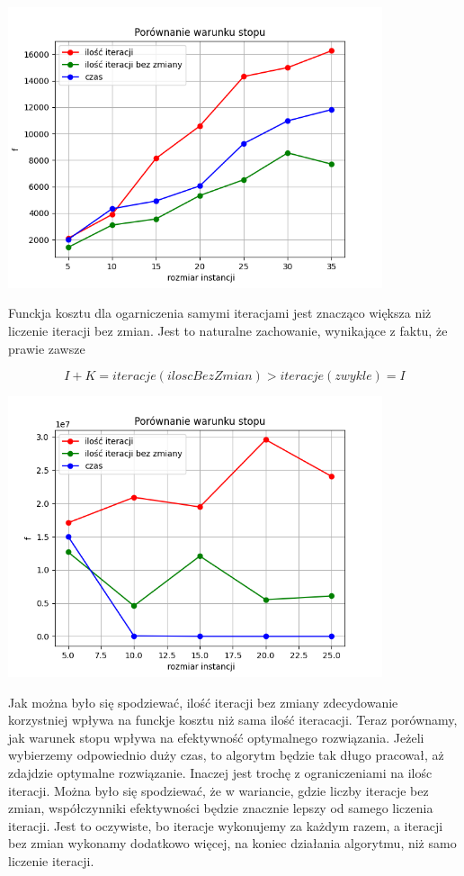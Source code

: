 \documentclass{article}
\begin{document}
    \includegraphics[width=11cm]{../spr2img/Figure_8.png}

    Funckja kosztu dla ogarniczenia samymi iteracjami jest znacząco większa niż liczenie
    iteracji bez zmian. Jest to naturalne zachowanie, wynikające z faktu, że prawie zawsze

    $$I + K = iteracje(iloscBezZmian) > iteracje(zwykle) = I$$

    \includegraphics[width=11cm]{../spr2img/Figure_10.png}

    Jak można było się spodziewać, ilość iteracji bez zmiany zdecydowanie korzystniej
    wpływa na funckje kosztu niż sama ilość iteracacji. Teraz porównamy, jak
    warunek stopu wpływa na efektywność optymalnego rozwiązania. Jeżeli wybierzemy odpowiednio duży czas,
    to algorytm będzie tak długo pracował, aż zdajdzie optymalne rozwiązanie. Inaczej jest trochę
    z ograniczeniami na ilośc iteracji. Można było się spodziewać, że w wariancie, gdzie liczby iteracje
    bez zmian, współczynniki  efektywności będzie znacznie lepszy od samego liczenia iteracji.
    Jest to oczywiste, bo iteracje wykonujemy za każdym razem, a iteracji bez zmian wykonamy dodatkowo więcej,
    na koniec działania algorytmu, niż samo liczenie iteracji.
\end{document}
